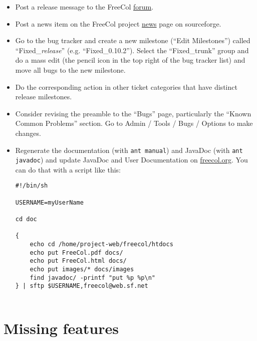 \documentclass[12pt]{book}
\begin{document}
\begin{itemize}
\item Post a release message to the FreeCol
  \href{https://sourceforge.net/p/freecol/discussion/141200/}{forum}.

\item Post a news item on the FreeCol project \href{https://sourceforge.net/p/freecol/news/}{news} page on sourceforge.

\item Go to the bug tracker and create a new milestone (``Edit
  Milestones'') called ``Fixed\_\emph{release}''
  (e.g. ``Fixed\_0.10.2'').  Select the ``Fixed\_trunk'' group and do
  a mass edit (the pencil icon in the top right of the bug tracker
  list) and move all bugs to the new milestone.

\item Do the corresponding action in other ticket categories that
  have distinct release milestones.

\item Consider revising the preamble to the ``Bugs'' page,
  particularly the ``Known Common Problems'' section.  Go to Admin /
  Tools / Bugs / Options to make changes.

\item Regenerate the documentation (with \verb+ant manual+) and
  JavaDoc (with \verb+ant javadoc+) and update JavaDoc and User
  Documentation on \href{freecol.org}{freecol.org}. You can do that
  with a script like this:

\begin{verbatim}
#!/bin/sh

USERNAME=myUserName

cd doc

{
    echo cd /home/project-web/freecol/htdocs
    echo put FreeCol.pdf docs/
    echo put FreeCol.html docs/
    echo put images/* docs/images
    find javadoc/ -printf "put %p %p\n"
} | sftp $USERNAME,freecol@web.sf.net


\end{verbatim}

%

\end{itemize}

\hypertarget{Missing features}{\chapter{Missing features}}
\end{document}
